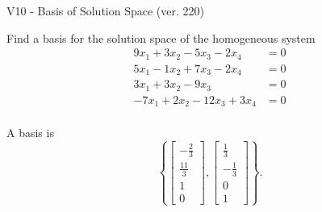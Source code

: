 \begin{exercise}
  \begin{exerciseTitle}V10 - Basis of Solution Space (ver. 220)\end{exerciseTitle}
  \begin{exerciseStatement}
    Find a basis for the solution space of the homogeneous system 
\begin{align*}
 9 x_ 1 + 3 x_ 2 -5 x_ 3 -2 x_ 4 &= 0  \\ 
  5 x_ 1 -1 x_ 2 + 7 x_ 3 -2 x_ 4 &= 0  \\ 
  3 x_ 1 + 3 x_ 2 -9 x_ 3 &= 0  \\ 
  -7 x_ 1 + 2 x_ 2 -12 x_ 3 + 3 x_ 4 &= 0  \\ 
 \end{align*}


 
  \end{exerciseStatement}

  \begin{exerciseAnswer}
   A basis is   
\[\left\{\left[\begin{array}{c}
-\frac{2}{3} \\
\frac{11}{3} \\
1 \\
0
\end{array}\right] , \left[\begin{array}{c}
\frac{1}{3} \\
-\frac{1}{3} \\
0 \\
1
\end{array}\right]\right\}.\]

  


  \end{exerciseAnswer}
\end{exercise}
